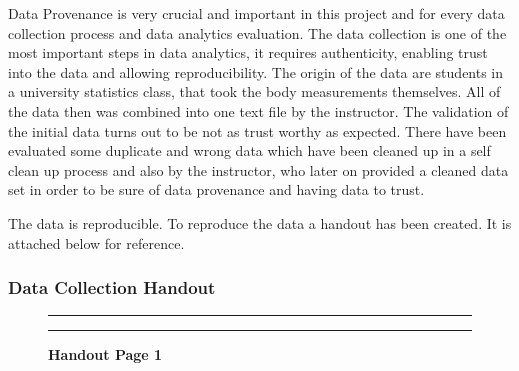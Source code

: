 \documentclass[]{article}
\begin{document}
Data Provenance is very crucial and important in this project and for
every data collection process and data analytics evaluation. The data
collection is one of the most important steps in data analytics, it
requires authenticity, enabling trust into the data and allowing
reproducibility. The origin of the data are students in a university
statistics class, that took the body measurements themselves. All of the
data then was combined into one text file by the instructor. The
validation of the initial data turns out to be not as trust worthy as
expected. There have been evaluated some duplicate and wrong data which
have been cleaned up in a self clean up process and also by the
instructor, who later on provided a cleaned data set in order to be sure
of data provenance and having data to trust.

The data is reproducible. To reproduce the data a handout has been
created. It is attached below for reference.

\newpage
\subsubsection{Data Collection Handout}
\label{sec:appendix-data-handout}

\begin{figure}[!ht]
    \hrule
    \caption{ \textbf{Handout Page 1} }
    \begin{center}
    \end{center}
    \label{fig:handout-1}
    \hrule
\end{figure}
\end{document}
